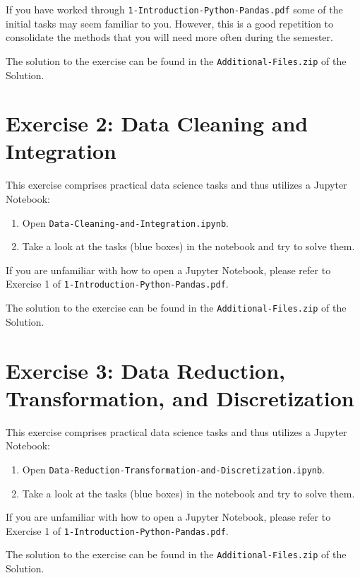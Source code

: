 \documentclass[
english,
smallborders
]{i6prcsht}
\begin{document}
If you have worked through \texttt{1-Introduction-Python-Pandas.pdf} some of the initial tasks may seem familiar to you. However, this is a good repetition to consolidate the methods that you will need more often during the semester.

\begin{solution}
	The solution to the exercise can be found in the \texttt{Additional-Files.zip} of the Solution.
\end{solution}

\section*{Exercise 2: Data Cleaning and Integration}

This exercise comprises practical data science tasks and thus utilizes a Jupyter Notebook:

\begin{enumerate}
	\item Open \texttt{Data-Cleaning-and-Integration.ipynb}.
	\item Take a look at the tasks (blue boxes) in the notebook and try to solve them.
\end{enumerate}

If you are unfamiliar with how to open a Jupyter Notebook, please refer to Exercise 1 of \texttt{1-Introduction-Python-Pandas.pdf}.

\begin{solution}
	The solution to the exercise can be found in the \texttt{Additional-Files.zip} of the Solution.
\end{solution}

\section*{Exercise 3: Data Reduction, Transformation, and Discretization}

This exercise comprises practical data science tasks and thus utilizes a Jupyter Notebook:

\begin{enumerate}
	\item Open \texttt{Data-Reduction-Transformation-and-Discretization.ipynb}.
	\item Take a look at the tasks (blue boxes) in the notebook and try to solve them.
\end{enumerate}

If you are unfamiliar with how to open a Jupyter Notebook, please refer to Exercise 1 of \texttt{1-Introduction-Python-Pandas.pdf}.

\begin{solution}
	The solution to the exercise can be found in the \texttt{Additional-Files.zip} of the Solution.
\end{solution}
\end{document}

